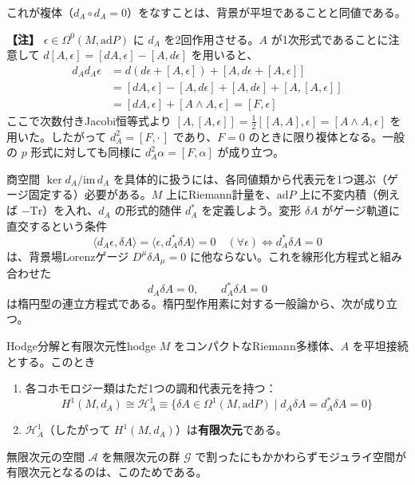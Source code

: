 \documentclass[uplatex, dvipdfmx, book]{jsbook}
\newenvironment{note}{\vspace{1ex}\par\footnotesize\noindent\textbf{【注】}}{\par\vspace{1ex}}
\begin{document}
これが複体（$d_A \circ d_A = 0$）をなすことは、背景が平坦であることと同値である。

\begin{note}
$\epsilon \in \Omega^0(M, \mathrm{ad}P)$ に $d_A$ を2回作用させる。$A$ が1次形式であることに注意して $d[A, \epsilon] = [dA, \epsilon] - [A, d\epsilon]$ を用いると、
\begin{align*}
d_A d_A \epsilon &= d(d\epsilon + [A, \epsilon]) + [A, d\epsilon + [A, \epsilon]] \\
&= [dA, \epsilon] - [A, d\epsilon] + [A, d\epsilon] + [A, [A, \epsilon]] \\
&= [dA, \epsilon] + [A \wedge A, \epsilon] = [F, \epsilon]
\end{align*}
ここで次数付きJacobi恒等式より $[A, [A, \epsilon]] = \frac{1}{2}[[A, A], \epsilon] = [A \wedge A, \epsilon]$ を用いた。したがって $d_A^2 = [F, \cdot\,]$ であり、$F = 0$ のときに限り複体となる。一般の $p$ 形式に対しても同様に $d_A^2 \alpha = [F, \alpha]$ が成り立つ。
\end{note}

商空間 $\ker d_A / \mathrm{im}\, d_A$ を具体的に扱うには、各同値類から代表元を1つ選ぶ（ゲージ固定する）必要がある。$M$ 上にRiemann計量を、$\mathrm{ad}P$ 上に不変内積（例えば $-\mathrm{Tr}$）を入れ、$d_A$ の形式的随伴 $d_A^*$ を定義しよう。変形 $\delta A$ がゲージ軌道に直交するという条件
\begin{equation}
    \langle d_A \epsilon, \delta A \rangle = \langle \epsilon, d_A^* \delta A \rangle = 0 \quad (\forall \epsilon) \iff d_A^* \delta A = 0
\end{equation}
は、背景場Lorenzゲージ $D^\mu \delta A_\mu = 0$ に他ならない。これを線形化方程式と組み合わせた
\begin{equation}
    d_A \delta A = 0, \qquad d_A^* \delta A = 0
\end{equation}
は楕円型の連立方程式である。楕円型作用素に対する一般論から、次が成り立つ。

\begin{mythm}{Hodge分解と有限次元性}{hodge}
$M$ をコンパクトなRiemann多様体、$A$ を平坦接続とする。このとき
\begin{enumerate}
    \item 各コホモロジー類はただ1つの調和代表元を持つ：
    \begin{equation*}
        H^1(M, d_A) \cong \mathcal{H}^1_A \equiv \{ \delta A \in \Omega^1(M, \mathrm{ad}P) \mid d_A \delta A = d_A^* \delta A = 0 \}
    \end{equation*}
    \item $\mathcal{H}^1_A$（したがって $H^1(M, d_A)$）は\textbf{有限次元}である。
\end{enumerate}
\end{mythm}無限次元の空間 $\mathcal{A}$ を無限次元の群 $\mathcal{G}$ で割ったにもかかわらずモジュライ空間が有限次元となるのは、このためである。
\end{document}
